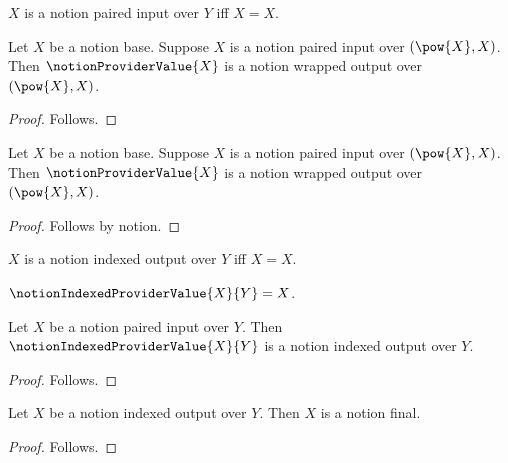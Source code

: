 \begin{definition}\label{notion_provider_paired_input}
    $X$ is a notion paired input over $Y$ iff $X=X$.
\end{definition}

\begin{classification}\label{notion_provider_nested_premise_result}
    Let $X$ be a notion base.
    Suppose $X$ is a notion paired input over $(\pow{X},X)$.
    Then $\notionProviderValue{X}$ is a notion wrapped output over
        $(\pow{X},X)$.
\end{classification}
\begin{proof}
    Follows.
\end{proof}

\begin{proposition}\label{notion_provider_nested_premise_use}
    Let $X$ be a notion base.
    Suppose $X$ is a notion paired input over $(\pow{X},X)$.
    Then $\notionProviderValue{X}$ is a notion wrapped output over
        $(\pow{X},X)$.
\end{proposition}
\begin{proof}
    Follows by notion.
\end{proof}

\begin{definition}\label{notion_provider_indexed_output}
    $X$ is a notion indexed output over $Y$ iff $X=X$.
\end{definition}

\begin{definition}\label{notion_indexed_provider_value}
    $\notionIndexedProviderValue{X}{Y}=X$.
\end{definition}

\begin{classification}\label{notion_indexed_provider_value_result}
    Let $X$ be a notion paired input over $Y$.
    Then $\notionIndexedProviderValue{X}{Y}$ is a notion indexed output
        over $Y$.
\end{classification}
\begin{proof}
    Follows.
\end{proof}

\begin{classification}\label{notion_indexed_output_is_final}
    Let $X$ be a notion indexed output over $Y$.
    Then $X$ is a notion final.
\end{classification}
\begin{proof}
    Follows.
\end{proof}

